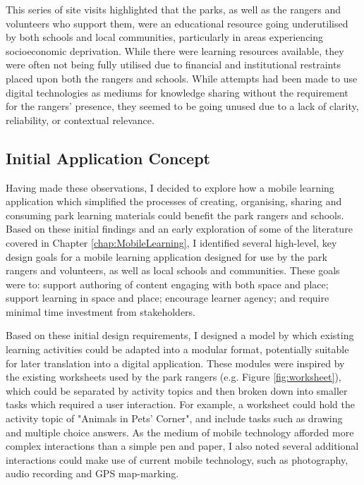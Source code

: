 This series of site visits highlighted that the parks, as well as the rangers and volunteers who support them, were an educational resource going underutilised by both schools and local communities, particularly in areas experiencing socioeconomic deprivation. While there were learning resources available, they were often not being fully utilised due to financial and institutional restraints placed upon both the rangers and schools. While attempts had been made to use digital technologies as mediums for knowledge sharing without the requirement for the rangers' presence, they seemed to be going unused due to a lack of clarity, reliability, or contextual relevance.

\subsection{Initial Application Concept}

Having made these observations, I decided to explore how a mobile learning application which simplified the processes of creating, organising, sharing and consuming park learning materials could benefit the park rangers and schools. Based on these initial findings and an early exploration of some of the literature covered in Chapter \ref{chap:MobileLearning}, I identified several high-level, key design goals for a mobile learning application designed for use by the park rangers and volunteers, as well as local schools and communities. These goals were to: support authoring of content engaging with both space and place; support learning in space and place; encourage learner agency; and require minimal time investment from stakeholders. 

Based on these initial design requirements, I designed a model by which existing learning activities could be adapted into a modular format, potentially suitable for later translation into a digital application. These modules were inspired by the existing worksheets used by the park rangers (e.g. Figure \ref{fig:worksheet}), which could be separated by activity topics and then broken down into smaller tasks which required a user interaction. For example, a worksheet could hold the activity topic of "Animals in Pets' Corner", and include tasks such as drawing and multiple choice answers. As the medium of mobile technology afforded more complex interactions than a simple pen and paper, I also noted several additional interactions could make use of current mobile technology, such as photography, audio recording and GPS map-marking.

